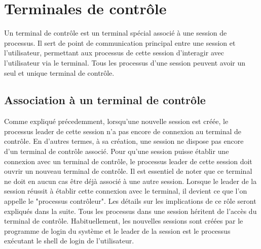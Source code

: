 \section{Terminales de contrôle}
Un terminal de contrôle est un terminal spécial associé à une session de processus. Il sert de point de communication principal entre une session et l'utilisateur, permettant aux processus de cette session d'interagir avec l'utilisateur via le terminal. Tous les processus d’une session peuvent avoir un seul et unique terminal de contrôle.

\subsection{Association à un terminal de contrôle}

Comme expliqué précedemment, lorsqu'une nouvelle session est créée, le processus leader de cette session n'a pas encore de connexion au terminal de contrôle. En d'autres termes, à sa création, une session ne dispose pas encore d'un terminal de contrôle associé.
\newline
Pour qu'une session puisse établir une connexion avec un terminal de contrôle, le processus leader de cette session doit ouvrir un nouveau terminal de contrôle. Il est essentiel de noter que ce terminal ne doit en aucun cas être déjà associé à une autre session. 
\newline
Lorsque le leader de la session réussit à établir cette connexion avec le terminal, il devient ce que l'on appelle le "processus contrôleur". Les détails sur les implications de ce rôle seront expliqués dans la suite. 
\newline
Tous les processus dans une session héritent de l’accès du terminal de contrôle. 
Habituellement, les nouvelles sessions sont créées par le programme de login du système et le leader de la session est le processus exécutant le shell de login de l'utilisateur.
